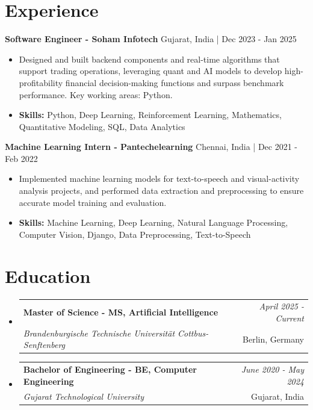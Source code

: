 \documentclass[a4paper,11pt]{article}
\makeatletter
\newcommand{\resumeSubheading}[4]{
\vspace{0.5mm}\item
    \begin{tabular*}{\linewidth}[t]{l@{\extracolsep{\fill}}r}
        \textbf{#1} & \textit{\footnotesize{#4}} \\
        \textit{\footnotesize{#3}} &  \footnotesize{#2}\\
    \end{tabular*}
    \vspace{-2.4mm}
}
\makeatother
\begin{document}
\section{\textbf{Experience}}


\vspace{1mm}
  \textbf{Software Engineer - Soham Infotech} \hfill Gujarat, India | Dec 2023 - Jan 2025
\vspace{-1.5mm} %
\begin{itemize}
  \item Designed and built backend components and real-time algorithms that support trading operations, leveraging quant and AI models to develop high-profitability financial decision-making functions and surpass benchmark performance. Key working areas: Python.

\vspace{-2mm}
  \item \textbf{Skills:} Python, Deep Learning, Reinforcement Learning, Mathematics, Quantitative Modeling, SQL, Data Analytics
\end{itemize}

\vspace{1mm}
  \textbf{Machine Learning Intern - Pantechelearning} \hfill Chennai, India | Dec 2021 - Feb 2022
\vspace{-1.5mm} %
\begin{itemize}
  \item Implemented machine learning models for text-to-speech and visual-activity analysis projects, and performed data extraction and preprocessing to ensure accurate model training and evaluation.
\vspace{-2mm}
  \item \textbf{Skills:} Machine Learning, Deep Learning, Natural Language Processing, Computer Vision, Django, Data Preprocessing, Text-to-Speech
\end{itemize}\section{\textbf{Education}}
\vspace{-0.4mm}

\begin{itemize}[leftmargin=0.15in, label={}]
\resumeSubheading
{Master of Science - MS, Artificial Intelligence }{Berlin, Germany}
{Brandenburgische Technische Universität Cottbus-Senftenberg  }{April 2025 - Current}

\vspace{1.0mm} %
\resumeSubheading
{Bachelor of Engineering - BE, Computer Engineering  }{Gujarat, India}
{Gujarat Technological University }{June 2020 - May 2024}

\end{itemize}
\end{document}
